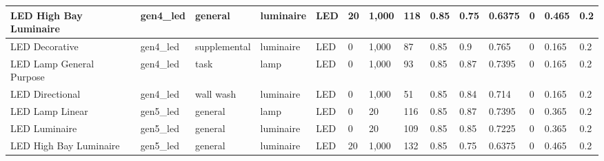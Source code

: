 \begin{center}
\begin{landscape}
\begin{longtable}{|p{0.75in}|p{0.65in}|p{0.47in}|p{0.4in}|p{0.45in}|p{0.4in}|p{0.4in}|p{0.4in}|p{0.4in}|p{0.4in}|p{0.4in}|p{0.4in}|p{0.4in}|p{0.4in}|}
  LED High Bay Luminaire     & gen4\_led               & general                & luminaire     & LED                     & 20                    & 1,000                  & 118                             & 0.85                    & 0.75                        & 0.6375               & 0                   & 0.465            & 0.2              \\ \hline
  LED Decorative             & gen4\_led               & supplemental           & luminaire     & LED                     & 0                     & 1,000                  & 87                              & 0.85                    & 0.9                         & 0.765                & 0                   & 0.165            & 0.2              \\ \hline
  LED Lamp General Purpose   & gen4\_led               & task                   & lamp          & LED                     & 0                     & 1,000                  & 93                              & 0.85                    & 0.87                        & 0.7395               & 0                   & 0.165            & 0.2              \\ \hline
  LED Directional            & gen4\_led               & wall wash              & luminaire     & LED                     & 0                     & 1,000                  & 51                              & 0.85                    & 0.84                        & 0.714                & 0                   & 0.165            & 0.2              \\ \hline
  LED Lamp Linear            & gen5\_led               & general                & lamp          & LED                     & 0                     & 20                    & 116                             & 0.85                    & 0.87                        & 0.7395               & 0                   & 0.365            & 0.2              \\ \hline
  LED Luminaire              & gen5\_led               & general                & luminaire     & LED                     & 0                     & 20                    & 109                             & 0.85                    & 0.85                        & 0.7225               & 0                   & 0.365            & 0.2              \\ \hline
  LED High Bay Luminaire     & gen5\_led               & general                & luminaire     & LED                     & 20                    & 1,000                  & 132                             & 0.85                    & 0.75                        & 0.6375               & 0                   & 0.465            & 0.2              \\ \hline

\end{longtable}
\end{landscape}
\end{center}
